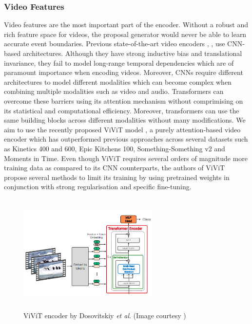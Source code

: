 \subsubsection{Video Features}
\par Video features are the most important part of the encoder. Without a robust and rich feature space for videos, the proposal generator would never be able to learn accurate event boundaries. Previous state-of-the-art video encoders \cite{carreira2018quo}, \cite{csn}, \cite{r(2+1)d} use CNN-based architectures. Although they have strong inductive bias and translational invariance, they fail to model long-range temporal dependencies which are of paramount importance when encoding videos. Moreover, CNNs require different architectures to model different modalities which can become complex when combining multiple modalities such as video and audio. Transformers \cite{tfm} can overcome these barriers using its attention mechanism without comprimising on its statistical and computational efficiency. Moreover, transformers can use the same building blocks across different modalities without many modifications. We aim to use the recently proposed ViViT model \cite{vivit}, a purely attention-based video encoder which has outperformed previous approaches across several datasets such as  Kinetics 400 and 600, Epic
Kitchens 100, Something-Something v2 and Moments in Time. Even though ViViT requires several orders of magnitude more training data as compared to its CNN counterparts, the authors of ViViT propose several methods to limit its training by using pretrained weights in conjunction with strong regularisation and specific fine-tuning. 

\begin{figure} [H]
	\centering
	\includegraphics[width=7cm, height=6cm] {assets/img/vivit_methodology.png}
	\caption{ViViT encoder by Dosovitskiy \textit{et al}. (Image courtesy \cite{vivit})}
\end{figure}

